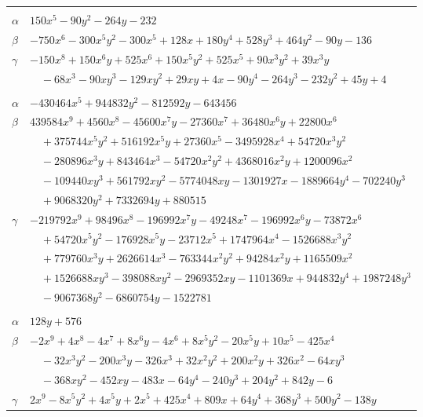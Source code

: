\documentclass[11pt]{article}
\begin{document}
\begin{longtable}{@{}ll@{}}
\addlinespace[3pt]
\multicolumn{2}{@{}l}{$\{i,j\}=\{21,29\}$, $k_{ij}=2^{3}\cdot 13$}\\
$\alpha$ & $150x^{5}-90y^{2}-264y-232$\\
$\beta$ & $-750x^{6}-300x^{5}y^{2}-300x^{5}+128x+180y^{4}+528y^{3}+464y^{2}-90y-136$\\
$\gamma$ & $-150x^{8}+150x^{6}y+525x^{6}+150x^{5}y^{2}+525x^{5}+90x^{3}y^{2}+39x^{3}y$\\
 & $\quad -68x^{3}-90xy^{3}-129xy^{2}+29xy+4x-90y^{4}-264y^{3}-232y^{2}+45y+4$\\
\addlinespace[3pt]
\multicolumn{2}{@{}l}{$\{i,j\}=\{21,31\}$, $k_{ij}=2\cdot 5\cdot 7\cdot 17$}\\
$\alpha$ & $-430464x^{5}+944832y^{2}-812592y-643456$\\
$\beta$ & $439584x^{9}+4560x^{8}-45600x^{7}y-27360x^{7}+36480x^{6}y+22800x^{6}$\\
 & $\quad +375744x^{5}y^{2}+516192x^{5}y+27360x^{5}-3495928x^{4}+54720x^{3}y^{2}$\\
 & $\quad -280896x^{3}y+843464x^{3}-54720x^{2}y^{2}+4368016x^{2}y+1200096x^{2}$\\
 & $\quad -109440xy^{3}+561792xy^{2}-5774048xy-1301927x-1889664y^{4}-702240y^{3}$\\
 & $\quad +9068320y^{2}+7332694y+880515$\\
$\gamma$ & $-219792x^{9}+98496x^{8}-196992x^{7}y-49248x^{7}-196992x^{6}y-73872x^{6}$\\
 & $\quad +54720x^{5}y^{2}-176928x^{5}y-23712x^{5}+1747964x^{4}-1526688x^{3}y^{2}$\\
 & $\quad +779760x^{3}y+2626614x^{3}-763344x^{2}y^{2}+94284x^{2}y+1165509x^{2}$\\
 & $\quad +1526688xy^{3}-398088xy^{2}-2969352xy-1101369x+944832y^{4}+1987248y^{3}$\\
 & $\quad -9067368y^{2}-6860754y-1522781$\\
\addlinespace[3pt]
\multicolumn{2}{@{}l}{$\{i,j\}=\{22,23\}$, $k_{ij}=2^{6}\cdot 11$}\\
$\alpha$ & $128y+576$\\
$\beta$ & $-2x^{9}+4x^{8}-4x^{7}+8x^{6}y-4x^{6}+8x^{5}y^{2}-20x^{5}y+10x^{5}-425x^{4}$\\
 & $\quad -32x^{3}y^{2}-200x^{3}y-326x^{3}+32x^{2}y^{2}+200x^{2}y+326x^{2}-64xy^{3}$\\
 & $\quad -368xy^{2}-452xy-483x-64y^{4}-240y^{3}+204y^{2}+842y-6$\\
$\gamma$ & $2x^{9}-8x^{5}y^{2}+4x^{5}y+2x^{5}+425x^{4}+809x+64y^{4}+368y^{3}+500y^{2}-138y$\\

\end{longtable}
\end{document}
